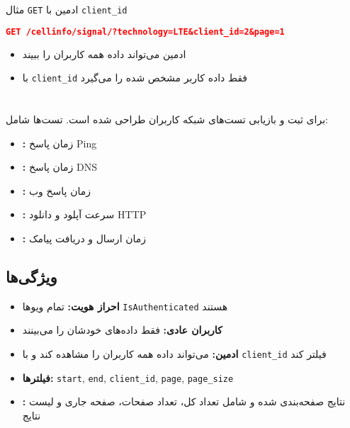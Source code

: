 \documentclass{report}
\begin{document}
مثال \texttt{GET} ادمین با \texttt{client\_id}
\begin{lstlisting}[language=json]
GET /cellinfo/signal/?technology=LTE&client_id=2&page=1
\end{lstlisting}
\begin{itemize}
    \item ادمین می‌تواند داده همه کاربران را ببیند
    \item با \texttt{client\_id} فقط داده کاربر مشخص شده را می‌گیرد
\end{itemize}








\section{}
 برای ثبت و بازیابی تست‌های شبکه کاربران طراحی شده است. تست‌ها شامل:
\begin{itemize}
    \item \textbf{:} زمان پاسخ Ping
    \item \textbf{:} زمان پاسخ DNS
    \item \textbf{:} زمان پاسخ وب
    \item \textbf{:} سرعت آپلود و دانلود HTTP
    \item \textbf{:} زمان ارسال و دریافت پیامک
\end{itemize}

\subsection{ویژگی‌ها}
\begin{itemize}
    \item \textbf{احراز هویت:} تمام ویوها \texttt{IsAuthenticated} هستند
    \item \textbf{کاربران عادی:} فقط داده‌های خودشان را می‌بینند
    \item \textbf{ادمین:} می‌تواند داده همه کاربران را مشاهده کند و با \texttt{client\_id} فیلتر کند
    \item \textbf{فیلترها:} \texttt{start}, \texttt{end}, \texttt{client\_id}, \texttt{page}, \texttt{page\_size}
    \item \textbf{:} نتایج صفحه‌بندی شده و شامل تعداد کل، تعداد صفحات، صفحه جاری و لیست نتایج
\end{itemize}
\end{document}
